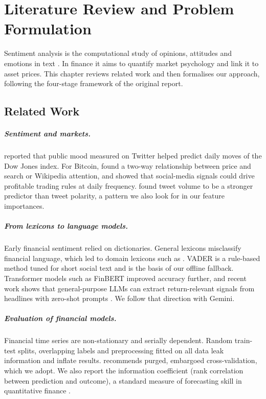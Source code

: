 \documentclass[12pt,a4paper,oneside]{report}
\begin{document}
\chapter{Literature Review and Problem Formulation}\label{ch:lit}

Sentiment analysis is the computational study of opinions, attitudes and
emotions in text \citep{liu2012sentiment}. In finance it aims to quantify
market psychology and link it to asset prices. This chapter reviews related
work and then formalises our approach, following the four-stage framework of
the original report.

\section{Related Work}\label{sec:related}
\paragraph{Sentiment and markets.} \citet{bollen2011twitter} reported that
public mood measured on Twitter helped predict daily moves of the Dow Jones
index. For Bitcoin, \citet{kristoufek2013bitcoin} found a two-way
relationship between price and search or Wikipedia attention, and
\citet{garcia2015social} showed that social-media signals could drive
profitable trading rules at daily frequency. \citet{abraham2018cryptocurrency}
found tweet volume to be a stronger predictor than tweet polarity, a pattern
we also look for in our feature importances.

\paragraph{From lexicons to language models.} Early financial sentiment
relied on dictionaries. General lexicons misclassify financial language, which
led to domain lexicons such as \citet{loughran2011liability}. VADER
\citep{hutto2014vader} is a rule-based method tuned for short social text and
is the basis of our offline fallback. Transformer models such as FinBERT
\citep{araci2019finbert} improved accuracy further, and recent work shows that
general-purpose LLMs can extract return-relevant signals from headlines with
zero-shot prompts \citep{lopezlira2023chatgpt}. We follow that direction with
Gemini.

\paragraph{Evaluation of financial models.} Financial time series are
non-stationary and serially dependent. Random train-test splits, overlapping
labels and preprocessing fitted on all data leak information and inflate
results. \citet{lopezdeprado2018advances} recommends purged, embargoed
cross-validation, which we adopt. We also report the information coefficient
(rank correlation between prediction and outcome), a standard measure of
forecasting skill in quantitative finance \citep{grinold2000active}.
\end{document}
